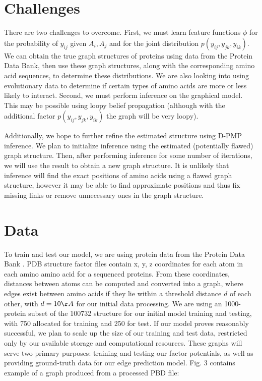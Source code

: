 \documentclass{article}
\begin{document}
\section{Challenges}
There are two challenges to overcome. First, we must learn feature functions $\phi$ for the probability of $y_{ij}$ given $A_i, A_j$ and for the joint distribution $p(y_{ij}, y_{jk}, y_{ik})$. We can obtain the true graph structures of proteins using data from the Protein Data Bank, then use these graph structures, along with the corresponding amino acid sequences, to determine these distributions. We are also looking into using evolutionary data to determine if certain types of amino acids are more or less likely to interact. Second, we must perform inference on the graphical model. This may be possible using loopy belief propagation (although with the additional factor $p(y_{ij}, y_{jk}, y_{ik})$ the graph will be very loopy).

Additionally, we hope to further refine the estimated structure using D-PMP inference. We plan to initialize inference using the estimated (potentially flawed) graph structure. Then, after performing inference for some number of iterations, we will use the result to obtain a new graph structure. It is unlikely that inference will find the exact positions of amino acids using a flawed graph structure, however it may be able to find approximate positions and thus fix missing links or remove unnecessary ones in the graph structure.

\section{Data}
	To train and test our model, we are using protein data from the Protein Data Bank \cite{pdb}. PDB structure factor files contain x, y, z coordinates for each atom in each amino amino acid for a sequenced proteins. From these coordinates, distances between atoms can be computed and converted into a graph, where edges exist between amino acids if they lie within a threshold distance $d$ of each other, with $d = 10 {\AA}$ for our initial data processing. We are using an 1000-protein subset of the 100732 structure for our initial model training and testing, with 750 allocated for training and 250 for test. If our model proves reasonably successful, we plan to scale up the size of our training and test data, restricted only by our available storage and computational resources. These graphs will serve two primary purposes: training and testing our factor potentials, as well as providing ground-truth data for our edge prediction model. Fig. 3 contains example of a graph produced from a processed PBD file:
\end{document}
